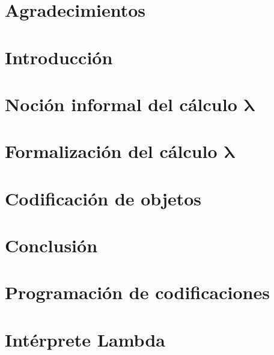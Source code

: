 \documentclass[letterpaper, twoside, openright, 11pt]{book}
\theoremstyle{plain}%
\theoremstyle{definition}
\theoremstyle{remark}
\newcommand{\bs}{\boldsymbol}
\begin{document}
\chapter*{Agradecimientos}
\thispagestyle{empty}


\tableofcontents

\mainmatter

\chapter*{Introducción}
\label{ch:introduccion}


\chapter{Noción informal del cálculo \texorpdfstring{$ \bs{λ} $}{lambda}}
\label{ch:nocion-informal}


\chapter{Formalización del cálculo \texorpdfstring{$ \bs{λ} $}{lambda}}
\label{ch:formalizacion}


\chapter{Codificación de objetos}
\label{ch:codificacion}


\chapter*{Conclusión}
\label{ch:conclusion}


\appendix

\chapter{Programación de codificaciones}
\label{ap:lambda-scheme}


\chapter{Intérprete Lambda}
\label{ap:lambda}

\newpage
\thispagestyle{empty}
\mbox{}
\newpage


\nocite{*}

\thispagestyle{empty}
{\small
}
\end{document}
